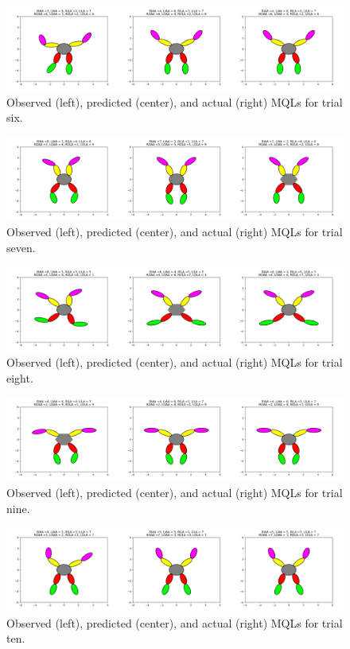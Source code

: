 \documentclass{article}
\begin{document}
\begin{figure}[!ht]
	\centering
	\includegraphics[width=180mm]{figs/mql_trial6_all.png}
	\caption{Observed (left), predicted (center), and actual (right) MQLs for trial six.}
\end{figure}
\begin{figure}[!ht]
	\centering
	\includegraphics[width=180mm]{figs/mql_trial7_all.png}
	\caption{Observed (left), predicted (center), and actual (right) MQLs for trial seven.}
\end{figure}
\begin{figure}[!ht]
	\centering
	\includegraphics[width=180mm]{figs/mql_trial8_all.png}
	\caption{Observed (left), predicted (center), and actual (right) MQLs for trial eight.}
\end{figure}
\begin{figure}[!ht]
	\centering
	\includegraphics[width=180mm]{figs/mql_trial9_all.png}
	\caption{Observed (left), predicted (center), and actual (right) MQLs for trial nine.}
\end{figure}
\begin{figure}[!ht]
	\centering
	\includegraphics[width=180mm]{figs/mql_trial10_all.png}
	\caption{Observed (left), predicted (center), and actual (right) MQLs for trial ten.}
\end{figure}
\end{document}
